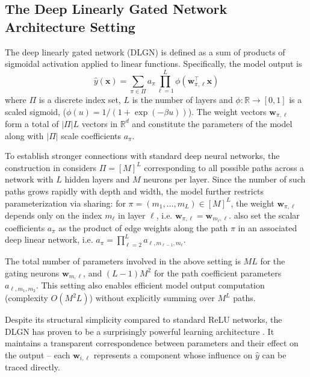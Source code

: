 \documentclass{article}
\theoremstyle{plain}
\theoremstyle{definition}
\theoremstyle{remark}
\newcommand{\R}{{\mathbb R}}
\newcommand{\1}{{\mathbf 1}}
\newcommand{\0}{{\mathbf 0}}
\newcommand{\w}{{\mathbf w}}
\newcommand{\x}{{\mathbf x}}
\renewcommand{\>}{{\rightarrow}}
\begin{document}


\subsection{The Deep Linearly Gated Network Architecture Setting}
\label{sec:DLGN_intro}
The deep linearly gated network (DLGN) is defined as a sum of products of sigmoidal activation applied to linear functions. Specifically, the model output is
\begin{equation}
    \hat y(\x) = \sum_{\pi \in \Pi} a_\pi \prod_{\ell =1}^L \phi(\w_{\pi,\ell} ^\top \x)
\end{equation}
where $\Pi$ is a discrete index set, $L$ is the number of layers and $\phi:\R\> [0,1]$ is a scaled sigmoid, ($\phi(u)=1/(1+\exp(-\beta u))$). The weight vectors $\w_{\pi,\ell}$ form a total of $|\Pi| L$ vectors in $\R^d$ and constitute the parameters of the model along with $|\Pi|$ scale coefficients $a_\pi$. 

To establish stronger connections with standard deep neural networks, the construction in \citet{Banerjee+25} considers $\Pi = [M]^L$  corresponding to all possible paths across a network with $L$ hidden layers and $M$ neurons per layer. Since the number of such paths grows rapidly with depth and width, the model further restricts parameterization via sharing: for $\pi = (m_1, \ldots, m_L) \in [M]^L$, the weight $\w_{\pi,\ell}$ depends only on the index $m_\ell$ in layer $\ell$, i.e. $\w_{\pi,\ell}  = \w_{m_\ell,\ell}$. \citet{Banerjee+25} also set the scalar coefficients $a_\pi$ as the product of edge weights along the path $\pi$ in an associated deep linear network, i.e. $a_\pi  = \prod_{\ell=2}^L a_{\ell,m_{\ell-1},m_{\ell}}$.  

The total number of parameters involved in the above setting is $ML$ for the gating neurons $\w_{m,\ell}$, and $(L-1)M^2$ for the path coefficient parameters $a_{\ell,m_1,m_2}$. This setting also enables efficient model output computation (complexity $O(M^2 L)$) without explicitly summing over $M^L$ paths.


Despite its structural simplicity compared to standard ReLU networks, the DLGN has proven to be a surprisingly powerful learning architecture \cite{Banerjee+25}. It maintains a transparent correspondence between parameters and their effect on the output -- each $\w_{i,\ell}$ represents a component whose influence on $\hat y$ can be traced directly. 
\end{document}
